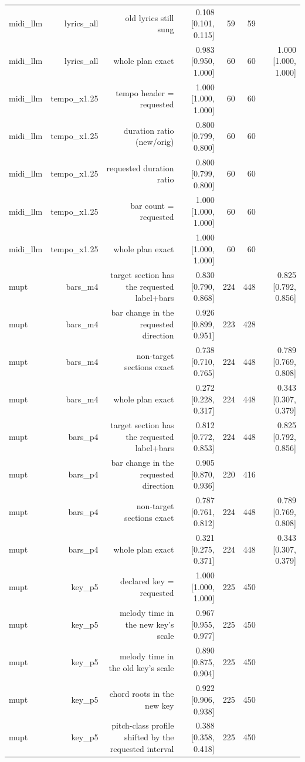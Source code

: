 \begin{table}[t]
\begin{tabular}{lrrrrrr}
midi\_llm & lyrics\_all & old lyrics still sung & 0.108 [0.101, 0.115] & 59 & 59 &  \\
midi\_llm & lyrics\_all & whole plan exact & 0.983 [0.950, 1.000] & 60 & 60 & 1.000 [1.000, 1.000] \\
midi\_llm & tempo\_x1.25 & tempo header = requested & 1.000 [1.000, 1.000] & 60 & 60 &  \\
midi\_llm & tempo\_x1.25 & duration ratio (new/orig) & 0.800 [0.799, 0.800] & 60 & 60 &  \\
midi\_llm & tempo\_x1.25 & requested duration ratio & 0.800 [0.799, 0.800] & 60 & 60 &  \\
midi\_llm & tempo\_x1.25 & bar count = requested & 1.000 [1.000, 1.000] & 60 & 60 &  \\
midi\_llm & tempo\_x1.25 & whole plan exact & 1.000 [1.000, 1.000] & 60 & 60 &  \\
mupt & bars\_m4 & target section has the requested label+bars & 0.830 [0.790, 0.868] & 224 & 448 & 0.825 [0.792, 0.856] \\
mupt & bars\_m4 & bar change in the requested direction & 0.926 [0.899, 0.951] & 223 & 428 &  \\
mupt & bars\_m4 & non-target sections exact & 0.738 [0.710, 0.765] & 224 & 448 & 0.789 [0.769, 0.808] \\
mupt & bars\_m4 & whole plan exact & 0.272 [0.228, 0.317] & 224 & 448 & 0.343 [0.307, 0.379] \\
mupt & bars\_p4 & target section has the requested label+bars & 0.812 [0.772, 0.853] & 224 & 448 & 0.825 [0.792, 0.856] \\
mupt & bars\_p4 & bar change in the requested direction & 0.905 [0.870, 0.936] & 220 & 416 &  \\
mupt & bars\_p4 & non-target sections exact & 0.787 [0.761, 0.812] & 224 & 448 & 0.789 [0.769, 0.808] \\
mupt & bars\_p4 & whole plan exact & 0.321 [0.275, 0.371] & 224 & 448 & 0.343 [0.307, 0.379] \\
mupt & key\_p5 & declared key = requested & 1.000 [1.000, 1.000] & 225 & 450 &  \\
mupt & key\_p5 & melody time in the new key's scale & 0.967 [0.955, 0.977] & 225 & 450 &  \\
mupt & key\_p5 & melody time in the old key's scale & 0.890 [0.875, 0.904] & 225 & 450 &  \\
mupt & key\_p5 & chord roots in the new key & 0.922 [0.906, 0.938] & 225 & 450 &  \\
mupt & key\_p5 & pitch-class profile shifted by the requested interval & 0.388 [0.358, 0.418] & 225 & 450 &  \\

\end{tabular}
\end{table}
